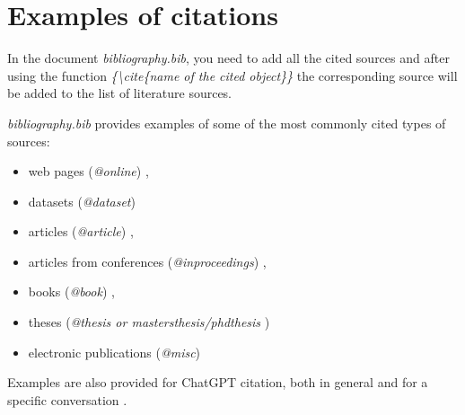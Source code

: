 \documentclass[]{VUMIFTemplateClass}
\begin{document}

\printbibliography[title = {References and sources}]

\appendix
\renewcommand{\thesection}{Appendix \arabic{section}. }

\section{\phantom{Appendix} Examples of citations}
In the document \textit{bibliography.bib}, you need to add all the cited sources and after using the function \textit{\{\textbackslash cite\{name of the cited object\}\}} the corresponding source will be added to the list of literature sources.


\textit{bibliography.bib} provides examples of some of the most commonly cited types of sources:
\begin{itemize}
    \item web pages (\textit{@online}) \cite{PvzInternetinisPuslapis},
    \item datasets (\textit{@dataset}) \cite{dataset}
    \item articles (\textit{@article}) \cite{PvzStraipsnLt, PvzStraipsnEn}, 
    \item articles from conferences (\textit{@inproceedings}) \cite{PvzKonfLt, PvzKonfEn}, 
    \item books (\textit{@book}) \cite{PvzKnygLt, PvzKnygEn}, 
    \item theses (\textit{@thesis or mastersthesis/phdthesis} \cite{PvzMagistrLt, PvzPhdEn})
    \item electronic publications (\textit{@misc}) \cite{PvzElPubLt, PvzElPubEn}
\end{itemize}

Examples are also provided for ChatGPT citation, both in general \cite{chatgpt_bendrai} and for a specific conversation \cite{chatgpt_pokalbis}.
\end{document}
